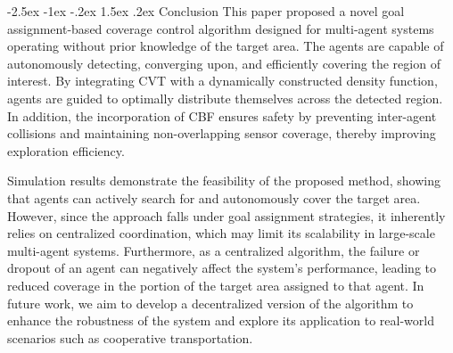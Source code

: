 \documentclass[fleqn,10pt,twocolumn]{main}
\makeatletter
\renewcommand\section{\@startsection{section}{1}{\z@}
  {-2.5ex \@plus -1ex \@minus -.2ex}
  {1.5ex \@plus .2ex}
  {\centering\normalfont\Large\bfseries}}
\makeatother
\begin{document}
\section{Conclusion} \label{conclusion}
This paper proposed a novel goal assignment-based coverage control algorithm designed for multi-agent systems operating without prior knowledge of the target area. The agents are capable of autonomously detecting, converging upon, and efficiently covering the region of interest. By integrating CVT with a dynamically constructed density function, agents are guided to optimally distribute themselves across the detected region. In addition, the incorporation of CBF ensures safety by preventing inter-agent collisions and maintaining non-overlapping sensor coverage, thereby improving exploration efficiency.

Simulation results demonstrate the feasibility of the proposed method, showing that agents can actively search for and autonomously cover the target area. However, since the approach falls under goal assignment strategies, it inherently relies on centralized coordination, which may limit its scalability in large-scale multi-agent systems. Furthermore, as a centralized algorithm, the failure or dropout of an agent can negatively affect the system’s performance, leading to reduced coverage in the portion of the target area assigned to that agent. In future work, we aim to develop a decentralized version of the algorithm to enhance the robustness of the system and explore its application to real-world scenarios such as cooperative transportation.
\end{document}
